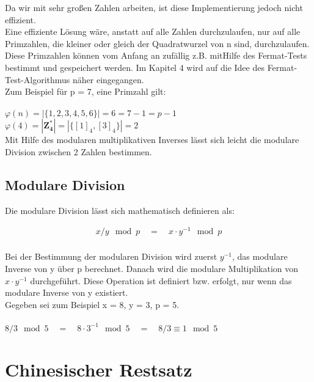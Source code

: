 Da wir mit sehr großen Zahlen arbeiten, ist diese Implementierung jedoch nicht effizient. \\
Eine effiziente Lösung wäre, anstatt auf alle Zahlen durchzulaufen, nur auf alle  Primzahlen, die kleiner oder gleich der Quadratwurzel von n sind, durchzulaufen. Diese Primzahlen können vom Anfang an zufällig z.B. mitHilfe des Fermat-Tests bestimmt und gespeichert werden. Im Kapitel 4 wird auf die Idee des Fermat-Test-Algorithmus näher eingegangen. \\

Zum Beispiel für p = 7, eine Primzahl gilt: \\
\\
  \(\varphi(n) = |\{ 1, 2, 3, 4, 5, 6 \}| = 6 = 7 - 1 = p - 1\) \\

\(\varphi(4) = |\mathbf{Z^*_4}| = |\{ [1]_4, [3]_4 \}| = 2\) \\


Mit Hilfe des modularen multiplikativen Inverses lässt sich leicht die modulare Division zwischen 2 Zahlen bestimmen.


\subsection{Modulare Division}

Die modulare Division lässt sich mathematisch definieren als:
\begin{ceqn}
\begin{align*}
    x/y \mod p \quad = \quad x \cdot y^{-1} \mod p \\
\end{align*}
\end{ceqn}

Bei der Bestimmung der modularen Division wird zuerst $ y^{-1}$, das modulare Inverse von y über p berechnet. Danach wird die modulare Multiplikation von $ x \cdot y^{-1} $ durchgeführt. Diese Operation ist definiert bzw. erfolgt, nur wenn das modulare Inverse von y existiert. 
\\
Gegeben sei zum Beispiel x = 8, y = 3, p = 5. \\
\\
\( 8/3 \mod 5 \quad = \quad 8 \cdot 3^{-1} \mod 5 \quad = \quad 8/3 \equiv 1 \mod 5 \)

\section{Chinesischer Restsatz}

